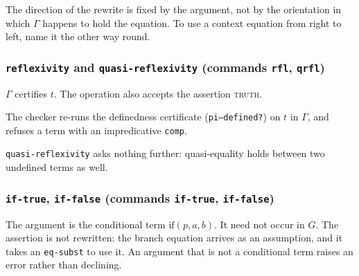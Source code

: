 \begin{remark}
The direction of the rewrite is fixed by the argument, not by the
orientation in which $\Gamma$ happens to hold the equation.  To use a
context equation from right to left, name it the other way round.
\end{remark}

\subsubsection*{\texttt{reflexivity} and \texttt{quasi-reflexivity}
  (commands \texttt{rfl}, \texttt{qrfl})}

\label{kop:reflexivity}%
\begin{VNBcond}
\item[Definedness] $\Gamma$ certifies $t$.  The operation also accepts
  the assertion \textsc{truth}.
\item[Verified by] The checker re-runs the definedness certificate
  (\texttt{pi--defined?}) on $t$ in $\Gamma$, and refuses a term with an
  impredicative \texttt{comp}.
\end{VNBcond}
\label{kop:quasi-reflexivity}%

\texttt{quasi-reflexivity} asks nothing further: quasi-equality holds
between two undefined terms as well.

\subsubsection*{\texttt{if-true}, \texttt{if-false}
  (commands \texttt{if-true}, \texttt{if-false})}

\label{kop:if-true}%
\label{kop:if-false}%

The argument is the conditional term $\mathrm{if}(p, a, b)$.  It need not
occur in $G$.  The assertion is not rewritten: the branch equation
arrives as an assumption, and it takes an \texttt{eq-subst} to use it.
An argument that is not a conditional term raises an error rather than
declining.


